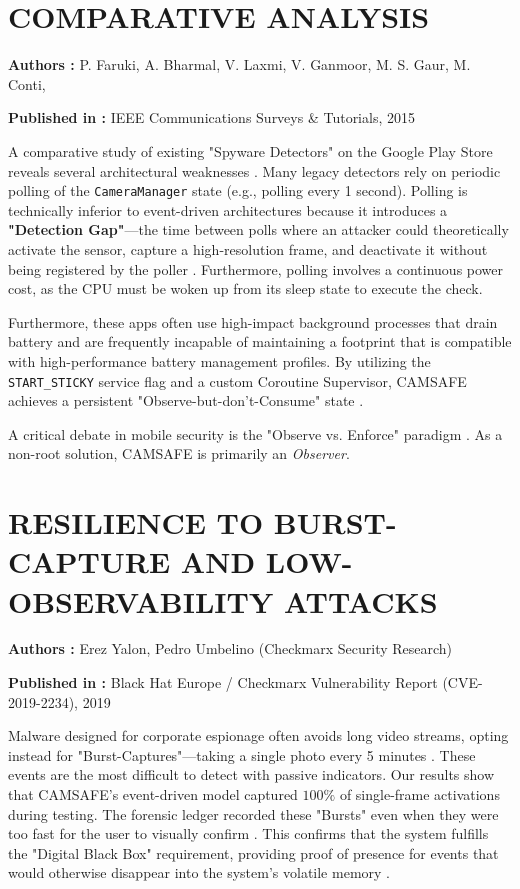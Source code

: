\documentclass[12pt,a4paper]{report}
\begin{document}
\begin{enumerate}
    \section{COMPARATIVE ANALYSIS}

    \textbf{Authors :} P. Faruki, A. Bharmal, V. Laxmi, V. Ganmoor, M. S. Gaur, M. Conti, 

    \textbf{Published in :} IEEE Communications Surveys \& Tutorials, 2015

    A comparative study of existing "Spyware Detectors" on the Google Play Store reveals several architectural weaknesses \cite{malwaresurvey}. Many legacy detectors rely on periodic polling of the \texttt{CameraManager} state (e.g., polling every 1 second). Polling is technically inferior to event-driven architectures because it introduces a \textbf{"Detection Gap"}—the time between polls where an attacker could theoretically activate the sensor, capture a high-resolution frame, and deactivate it without being registered by the poller \cite{checkmarx}. Furthermore, polling involves a continuous power cost, as the CPU must be woken up from its sleep state to execute the check.

    Furthermore, these apps often use high-impact background processes that drain battery and are frequently incapable of maintaining a footprint that is compatible with high-performance battery management profiles. By utilizing the \texttt{START\_STICKY} service flag and a custom Coroutine Supervisor, CAMSAFE achieves a persistent "Observe-but-don't-Consume" state \cite{edgecomp}.

    A critical debate in mobile security is the "Observe vs. Enforce" paradigm \cite{aurasium}. As a non-root solution, CAMSAFE is primarily an \textit{Observer}.
    \clearpage

    \section{RESILIENCE TO BURST-CAPTURE AND LOW-OBSERVABILITY ATTACKS}

    \textbf{Authors :} Erez Yalon, Pedro Umbelino (Checkmarx Security Research)

    \textbf{Published in :} Black Hat Europe / Checkmarx Vulnerability Report (CVE-2019-2234), 2019

    Malware designed for corporate espionage often avoids long video streams, opting instead for "Burst-Captures"—taking a single photo every 5 minutes \cite{placeraider}. These events are the most difficult to detect with passive indicators. Our results show that CAMSAFE's event-driven model captured $100\%$ of single-frame activations during testing. The forensic ledger recorded these "Bursts" even when they were too fast for the user to visually confirm \cite{checkmarx}. This confirms that the system fulfills the "Digital Black Box" requirement, providing proof of presence for events that would otherwise disappear into the system's volatile memory \cite{smarthome}.


\end{enumerate}
\end{document}
